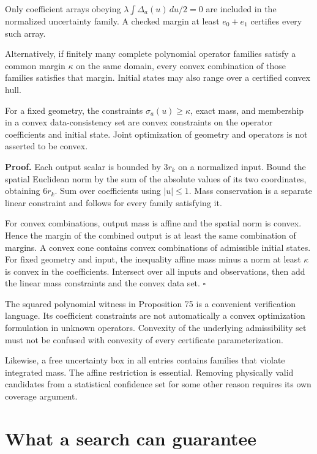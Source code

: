 Only coefficient arrays obeying \(\lambda\int\Delta_a(u)\,du/2=0\) are
included in the normalized uncertainty family. A checked margin at least
\(e_0+e_1\) certifies every such array.

Alternatively, if finitely many complete polynomial operator families
satisfy a common margin \(\kappa\) on the same domain, every convex
combination of those families satisfies that margin. Initial states may
also range over a certified convex hull.

For a fixed geometry, the constraints \(\sigma_a(u)\geq\kappa\), exact
mass, and membership in a convex data-consistency set are convex
constraints on the operator coefficients and initial state. Joint
optimization of geometry and operators is not asserted to be convex.

\textbf{Proof.} Each output scalar is bounded by \(3r_k\) on a
normalized input. Bound the spatial Euclidean norm by the sum of the
absolute values of its two coordinates, obtaining \(6r_k\). Sum over
coefficients using \(|u|\leq1\). Mass conservation is a separate linear
constraint and follows for every family satisfying it.

For convex combinations, output mass is affine and the spatial norm is
convex. Hence the margin of the combined output is at least the same
combination of margins. A convex cone contains convex combinations of
admissible initial states. For fixed geometry and input, the inequality
affine mass minus a norm at least \(\kappa\) is convex in the
coefficients. Intersect over all inputs and observations, then add the
linear mass constraints and the convex data set. \(\square\)

The squared polynomial witness in Proposition 75 is a convenient
verification language. Its coefficient constraints are not automatically
a convex optimization formulation in unknown operators. Convexity of the
underlying admissibility set must not be confused with convexity of
every certificate parameterization.

Likewise, a free uncertainty box in all entries contains families that
violate integrated mass. The affine restriction is essential. Removing
physically valid candidates from a statistical confidence set for some
other reason requires its own coverage argument.

\section{What a search can guarantee}\label{LSM:what-a-search-can-guarantee}

